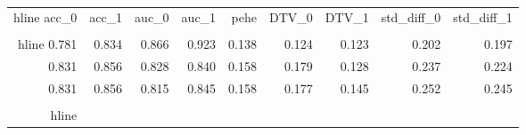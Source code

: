 \begin{table}[h]
\centering
\caption{}
\label{wd_para_2.0_wd_65.29910278320312}
\begin{tabular}{rrrrrrrrr}
\\hline
 acc\_0 &  acc\_1 &  auc\_0 &  auc\_1 &  pehe &  DTV\_0 &  DTV\_1 &  std\_diff\_0 &  std\_diff\_1 \\
\\hline
 0.781 &  0.834 &  0.866 &  0.923 & 0.138 &  0.124 &  0.123 &       0.202 &       0.197 \\
 0.831 &  0.856 &  0.828 &  0.840 & 0.158 &  0.179 &  0.128 &       0.237 &       0.224 \\
 0.831 &  0.856 &  0.815 &  0.845 & 0.158 &  0.177 &  0.145 &       0.252 &       0.245 \\
\\hline
\end{tabular}
\end{table}

